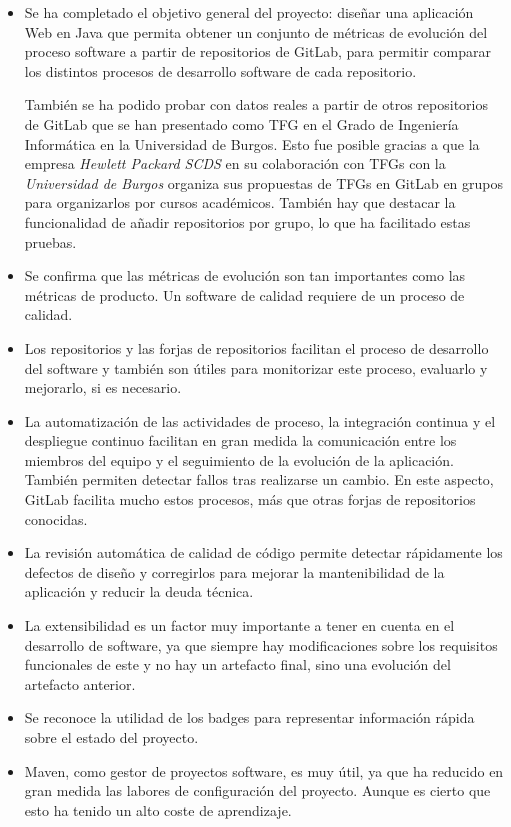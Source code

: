 \begin{itemize}
	\item Se ha completado el objetivo general del proyecto: diseñar una aplicación Web en Java que permita obtener un conjunto de métricas de evolución del proceso software \citep{ratzinger_space:_2007} a partir de repositorios de GitLab, para permitir comparar los distintos procesos de desarrollo software de cada repositorio. 
	
	También se ha podido probar con datos reales a partir de otros repositorios de GitLab que se han presentado como TFG en el Grado de Ingeniería Informática en la Universidad de Burgos. Esto fue posible gracias a que la empresa \textit{Hewlett Packard SCDS} en su colaboración con TFGs con la \textit{Universidad de Burgos} organiza sus propuestas de TFGs en GitLab en grupos para organizarlos por cursos académicos. También hay que destacar la funcionalidad de añadir repositorios por grupo, lo que ha facilitado estas pruebas.
	
	\item Se confirma que las métricas de evolución son tan importantes como las métricas de producto. Un software de calidad requiere de un proceso de calidad.
	\item Los repositorios y las forjas de repositorios facilitan el proceso de desarrollo del software y también son útiles para monitorizar este proceso, evaluarlo y mejorarlo, si es necesario.
	\item La automatización de las actividades de proceso, la integración continua y el despliegue continuo facilitan en gran medida la comunicación entre los miembros del equipo y el seguimiento de la evolución de la aplicación. También permiten detectar fallos tras realizarse un cambio. En este aspecto, GitLab facilita mucho estos procesos, más que otras forjas de repositorios conocidas.
	\item La revisión automática de calidad de código permite detectar rápidamente los defectos de diseño y corregirlos para mejorar la mantenibilidad de la aplicación y reducir la deuda técnica.
	\item La extensibilidad es un factor muy importante a tener en cuenta en el desarrollo de software, ya que siempre hay modificaciones sobre los requisitos funcionales de este y no hay un artefacto final, sino una evolución del artefacto anterior.
	\item Se reconoce la utilidad de los badges para representar información rápida sobre el estado del proyecto.
	\item Maven, como gestor de proyectos software, es muy útil, ya que ha reducido en gran medida las labores de configuración del proyecto. Aunque es cierto que esto ha tenido un alto coste de aprendizaje.
\end{itemize}

